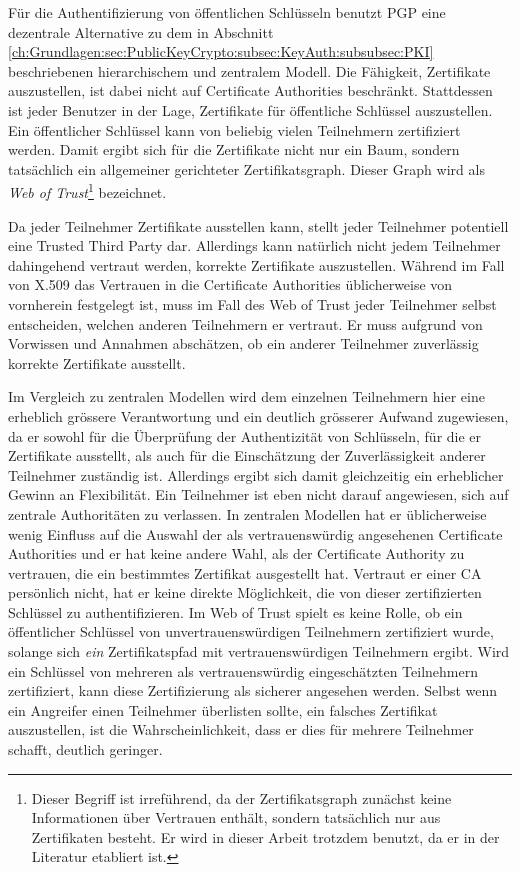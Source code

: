 F\"ur die Authentifizierung von \"offentlichen Schl\"usseln benutzt
PGP eine dezentrale Alternative zu dem in Abschnitt
\ref{ch:Grundlagen:sec:PublicKeyCrypto:subsec:KeyAuth:subsubsec:PKI}
beschriebenen hierarchischem und zentralem Modell\cite{Ashley1999}. Die F\"ahigkeit,
Zertifikate auszustellen, ist dabei nicht auf Certificate Authorities
beschr\"ankt. Stattdessen ist jeder Benutzer in der Lage, Zertifikate
f\"ur \"offentliche Schl\"ussel auszustellen. Ein \"offentlicher
Schl\"ussel kann von beliebig vielen Teilnehmern zertifiziert
werden. Damit ergibt sich f\"ur die Zertifikate nicht nur ein Baum,
sondern tats\"achlich ein allgemeiner gerichteter
Zertifikatsgraph. Dieser Graph wird als \emph{Web of Trust}\footnote{Dieser Begriff ist irref\"uhrend, da der
  Zertifikatsgraph zun\"achst keine Informationen \"uber Vertrauen
  enth\"alt, sondern tats\"achlich nur aus Zertifikaten besteht. Er
  wird in dieser Arbeit trotzdem benutzt, da er in der Literatur
  etabliert ist.} bezeichnet.

Da jeder Teilnehmer Zertifikate ausstellen kann, stellt jeder
Teilnehmer potentiell eine Trusted Third Party dar. Allerdings kann
nat\"urlich nicht jedem Teilnehmer dahingehend vertraut werden,
korrekte Zertifikate auszustellen. W\"ahrend im Fall von X.509 das
Vertrauen in die Certificate Authorities \"ublicherweise von
vornherein festgelegt ist, muss im Fall des Web of Trust jeder
Teilnehmer selbst entscheiden, welchen anderen Teilnehmern er
vertraut. Er muss aufgrund von Vorwissen und Annahmen absch\"atzen, ob
ein anderer Teilnehmer zuverl\"assig korrekte Zertifikate
ausstellt. 

Im Vergleich zu zentralen Modellen wird dem einzelnen Teilnehmern hier
eine erheblich gr\"ossere Verantwortung und ein deutlich gr\"osserer
Aufwand zugewiesen, da er sowohl f\"ur die \"Uberpr\"ufung der
Authentizit\"at von Schl\"usseln, f\"ur die er Zertifikate ausstellt,
als auch f\"ur die Einsch\"atzung der Zuverl\"assigkeit anderer
Teilnehmer zust\"andig ist. Allerdings ergibt sich damit gleichzeitig
ein erheblicher Gewinn an Flexibilit\"at. Ein Teilnehmer ist eben
nicht darauf angewiesen, sich auf zentrale Authorit\"aten zu
verlassen. In zentralen Modellen hat er \"ublicherweise wenig Einfluss
auf die Auswahl der als vertrauensw\"urdig angesehenen Certificate
Authorities und er hat keine andere Wahl, als der Certificate
Authority zu vertrauen, die ein bestimmtes Zertifikat ausgestellt
hat. Vertraut er einer CA pers\"onlich nicht, hat er keine direkte
M\"oglichkeit, die von dieser zertifizierten Schl\"ussel zu
authentifizieren. Im Web of Trust spielt es keine Rolle, ob ein
\"offentlicher Schl\"ussel von unvertrauensw\"urdigen Teilnehmern
zertifiziert wurde, solange sich \emph{ein} Zertifikatspfad mit
vertrauensw\"urdigen Teilnehmern ergibt. Wird ein Schl\"ussel von
mehreren als vertrauensw\"urdig eingesch\"atzten Teilnehmern
zertifiziert, kann diese Zertifizierung als sicherer angesehen
werden. Selbst wenn ein Angreifer einen Teilnehmer \"uberlisten
sollte, ein falsches Zertifikat auszustellen, ist die
Wahrscheinlichkeit, dass er dies f\"ur mehrere Teilnehmer schafft,
deutlich geringer.

